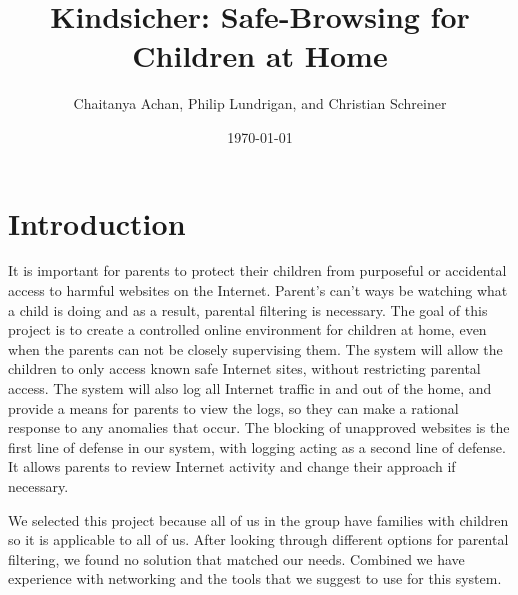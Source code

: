 \documentclass[12pt] {article}
\begin{document}
\title{Kindsicher: Safe-Browsing for Children at Home}
\author{Chaitanya Achan, Philip Lundrigan, and Christian Schreiner}
\date \today
\maketitle
\setcounter{page}{1}

%
%
%
%
%
%
%

\section*{Introduction}
It is important for parents to protect their children from purposeful or
accidental access to harmful websites on the Internet. Parent's can't ways be
watching what a child is doing and as a result, parental filtering is
necessary. The goal of this project is to create a controlled online
environment for children at home, even when the parents can not be closely
supervising them. The system will allow the children to only access known safe
Internet sites, without restricting parental access. The system will also log
all Internet traffic in and out of the home, and provide a means for parents to
view the logs, so they can make a rational response to any anomalies that
occur. The blocking of unapproved websites is the first line of defense in our system,
with logging acting as a second line of defense. It allows parents to review
Internet activity and change their approach if necessary.

We selected this project because all of us in the group have families with
children so it is applicable to all of us. After looking through different
options for parental filtering, we found no solution that matched our needs.
Combined we have experience with networking and the tools that we suggest to
use for this system.
\end{document}

